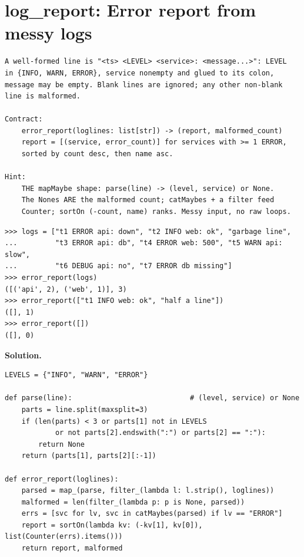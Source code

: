 \documentclass[10pt,letterpaper]{book}
\begin{document}
\section{log\_report: Error report from messy logs}
\begin{lstlisting}[style=ex]
A well-formed line is "<ts> <LEVEL> <service>: <message...>": LEVEL
in {INFO, WARN, ERROR}, service nonempty and glued to its colon,
message may be empty. Blank lines are ignored; any other non-blank
line is malformed.

Contract:
    error_report(loglines: list[str]) -> (report, malformed_count)
    report = [(service, error_count)] for services with >= 1 ERROR,
    sorted by count desc, then name asc.

Hint:
    THE mapMaybe shape: parse(line) -> (level, service) or None.
    The Nones ARE the malformed count; catMaybes + a filter feed
    Counter; sortOn (-count, name) ranks. Messy input, no raw loops.
\end{lstlisting}
\begin{lstlisting}[style=ex]
>>> logs = ["t1 ERROR api: down", "t2 INFO web: ok", "garbage line",
...         "t3 ERROR api: db", "t4 ERROR web: 500", "t5 WARN api: slow",
...         "t6 DEBUG api: no", "t7 ERROR db missing"]
>>> error_report(logs)
([('api', 2), ('web', 1)], 3)
>>> error_report(["t1 INFO web: ok", "half a line"])
([], 1)
>>> error_report([])
([], 0)
\end{lstlisting}
\noindent\textbf{Solution.}
\begin{lstlisting}[style=code]
LEVELS = {"INFO", "WARN", "ERROR"}

def parse(line):                            # (level, service) or None
    parts = line.split(maxsplit=3)
    if (len(parts) < 3 or parts[1] not in LEVELS
            or not parts[2].endswith(":") or parts[2] == ":"):
        return None
    return (parts[1], parts[2][:-1])

def error_report(loglines):
    parsed = map_(parse, filter_(lambda l: l.strip(), loglines))
    malformed = len(filter_(lambda p: p is None, parsed))
    errs = [svc for lv, svc in catMaybes(parsed) if lv == "ERROR"]
    report = sortOn(lambda kv: (-kv[1], kv[0]), list(Counter(errs).items()))
    return report, malformed
\end{lstlisting}
\end{document}
